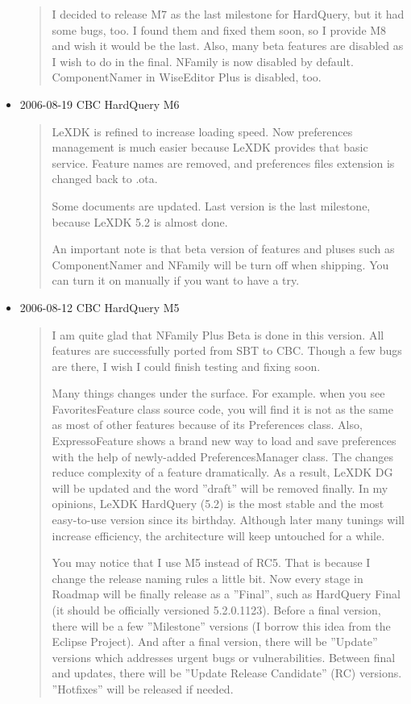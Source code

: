 \begin{itemize}
\begin{quotation}
    I decided to release M7 as the last milestone for HardQuery, but it had
    some bugs, too. I found them and fixed them soon, so I provide M8 and
    wish it would be the last. Also, many beta features are disabled as I
    wish to do in the final. NFamily is now disabled by default.
    ComponentNamer in WiseEditor Plus is disabled, too.

  \end{quotation}

  \item 2006-08-19 CBC HardQuery M6
  \begin{quotation}
    LeXDK is refined to increase loading speed. Now preferences management
    is much easier because LeXDK provides that basic service. Feature names
    are removed, and preferences files extension is changed back to .ota.

    Some documents are updated. Last version is the last milestone,
    because LeXDK 5.2 is almost done.

    An important note is that beta version of features and pluses such as
    ComponentNamer and NFamily will be turn off when shipping. You can turn
    it on manually if you want to have a try.
  \end{quotation}

  \item 2006-08-12 CBC HardQuery M5
  \begin{quotation}
    I am quite glad that NFamily Plus Beta is done in this version. All
    features are successfully ported from SBT to CBC. Though a few bugs are
    there, I wish I could finish testing and fixing soon.

    Many things changes under the surface. For example. when you see
    FavoritesFeature class source code, you will find it is not as the
    same as most of other features because of its Preferences class.
    Also, ExpressoFeature shows a brand new way to load and save
    preferences with the help of newly-added PreferencesManager class.
    The changes reduce complexity of a feature dramatically. As a result,
    LeXDK DG will be updated and the word ''draft'' will be removed
    finally. In my opinions, LeXDK HardQuery (5.2) is the most stable and
    the most easy-to-use version since its birthday. Although later many
    tunings will increase efficiency, the architecture will keep
    untouched for a while.

    You may notice that I use M5 instead of RC5. That is because I change
    the release naming rules a little bit. Now every stage in Roadmap will
    be finally release as a ''Final'', such as HardQuery Final (it should
    be officially versioned 5.2.0.1123). Before a final version, there will
    be a few ''Milestone'' versions (I borrow this idea from the Eclipse
    Project). And after a final version, there will be ''Update'' versions
    which addresses urgent bugs or vulnerabilities. Between final and
    updates, there will be ''Update Release Candidate'' (RC) versions.
    ''Hotfixes'' will be released if needed.


\end{quotation}
\end{itemize}
